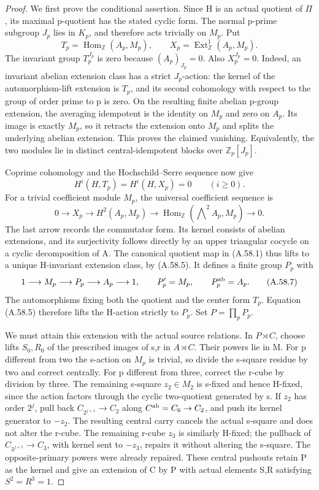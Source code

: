 \begin{proof}
We first prove the conditional assertion. Since H is an actual
quotient of \(\Pi\), its maximal p-quotient has the stated cyclic
form. The normal p-prime subgroup \(J_p\) lies in \(K_p\), and
therefore acts trivially on \(M_p\). Put
\[
 T_p=\operatorname{Hom}_{\mathbb Z}(A_p,M_p),\qquad
 X_p=\operatorname{Ext}^1_{\mathbb Z}(A_p,M_p).
 \tag{A.58.4}
\]
The invariant group \(T_p^{J_p}\) is zero because
\((A_p)_{J_p}=0\). Also \(X_p^{J_p}=0\). Indeed, an invariant
abelian extension class has a strict \(J_p\)-action: the kernel
of the automorphism-lift extension is \(T_p\), and its second
cohomology with respect to the group of order prime to p is
zero. On the resulting finite abelian p-group extension, the
averaging idempotent is the identity on \(M_p\) and zero on
\(A_p\). Its image is exactly \(M_p\), so it retracts the
extension onto \(M_p\) and splits the underlying abelian
extension. This proves the claimed vanishing. Equivalently, the
two modules lie in distinct central-idempotent blocks over
\(\mathbb Z_p[J_p]\).

Coprime cohomology and the Hochschild--Serre sequence now give
\[
 H^i(H,T_p)=H^i(H,X_p)=0\qquad(i\geq0).
 \tag{A.58.5}
\]
For a trivial coefficient module \(M_p\), the universal
coefficient sequence is
\[
 0\longrightarrow X_p\longrightarrow H^2(A_p,M_p)
 \longrightarrow
 \operatorname{Hom}_{\mathbb Z}
       (\mathop{\bigwedge}\nolimits^2 A_p,M_p)
 \longrightarrow0.
 \tag{A.58.6}
\]
The last arrow records the commutator form. Its kernel consists
of abelian extensions, and its surjectivity follows directly by
an upper triangular cocycle on a cyclic decomposition of A.
The canonical quotient map in (A.58.1) thus lifts to a unique
H-invariant extension class, by (A.58.5). It defines a finite
group \(P_p\) with
\[
 1\longrightarrow M_p\longrightarrow P_p\longrightarrow A_p
 \longrightarrow1,
 \qquad P_p'=M_p,\qquad P_p^{\rm ab}=A_p.
 \tag{A.58.7}
\]
The automorphisms fixing both the quotient and the center form
\(T_p\). Equation (A.58.5) therefore lifts the H-action strictly
to \(P_p\). Set \(P=\prod_p P_p\).

We must attain this extension with the actual source relations.
In \(P\rtimes C\), choose lifts \(S_0,R_0\) of the prescribed
images of s,r in \(A\rtimes C\). Their powers lie in M.
For p different from two the s-action on \(M_p\) is trivial,
so divide the s-square residue by two and correct centrally.
For p different from three, correct the r-cube by division by
three. The remaining s-square \(z_2\in M_2\) is s-fixed and
hence H-fixed, since the action factors through the cyclic
two-quotient generated by s. If \(z_2\) has order \(2^j\),
pull back
\(C_{2^{j+1}}\to C_2\) along
\(C^{\rm ab}=C_6\to C_2\), and push its kernel generator to
\(-z_2\). The resulting central carry cancels the actual
s-square and does not alter the r-cube. The remaining r-cube
\(z_3\) is similarly H-fixed; the pullback of
\(C_{3^{j+1}}\to C_3\), with kernel sent to \(-z_3\), repairs
it without altering the s-square. The opposite-primary powers
were already repaired. These central pushouts retain P as the
kernel and give an extension of C by P with actual elements
S,R satisfying \(S^2=R^3=1\).


\end{proof}
